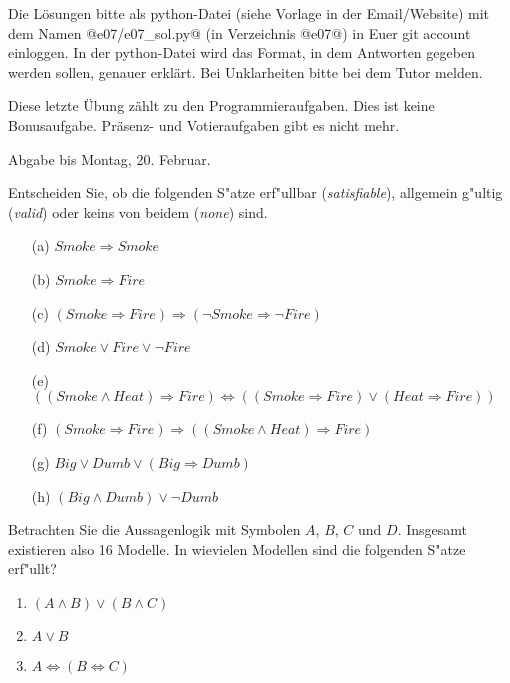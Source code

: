 

\renewcommand{\course}{Artificial Intelligence}
\renewcommand{\coursepicture}{course_ai}
\renewcommand{\coursedate}{Winter 2019}
\renewcommand{\exnum}{7}

\exercises

Die Lösungen bitte als python-Datei (siehe Vorlage in der
Email/Website) mit dem Namen @e07/e07_sol.py@ (in Verzeichnis @e07@)
in Euer git account einloggen. In der python-Datei wird das Format, in
dem Antworten gegeben werden sollen, genauer erklärt. Bei Unklarheiten
bitte bei dem Tutor melden.

Diese letzte Übung zählt zu den Programmieraufgaben. Dies ist keine
Bonusaufgabe. Präsenz- und Votieraufgaben gibt es nicht mehr.

Abgabe bis Montag, 20. Februar.


Entscheiden Sie, ob die folgenden S"atze erf"ullbar (\emph{satisfiable}),
allgemein g"ultig (\emph{valid}) oder keins von beidem (\emph{none})
sind. 

\begin{enumerate}
\item[(a)] $Smoke \Rightarrow Smoke$
\item[(b)] $Smoke \Rightarrow Fire$
\item[(c)] $(Smoke \Rightarrow Fire) \Rightarrow (\neg Smoke \Rightarrow \neg Fire)$
\item[(d)] $Smoke \vee Fire \vee \neg Fire$
\item[(e)] $((Smoke \wedge Heat) \Rightarrow Fire) \Leftrightarrow ((Smoke \Rightarrow Fire) \vee (Heat \Rightarrow Fire))$
\item[(f)] $(Smoke \Rightarrow Fire) \Rightarrow ((Smoke \wedge Heat) \Rightarrow Fire)$
\item[(g)] $Big \vee Dumb \vee (Big \Rightarrow Dumb)$
\item[(h)] $(Big \wedge Dumb) \vee \neg Dumb$
\end{enumerate}



Betrachten Sie die Aussagenlogik mit Symbolen $A$, $B$, $C$ und
$D$. Insgesamt existieren also 16 Modelle. In wievielen Modellen sind die folgenden S"atze erf"ullt?
\begin{enumerate}
\item $(A \wedge B) \vee (B \wedge  C)$
\item $A \vee B$
\item $A \Leftrightarrow (B \Leftrightarrow C)$
\end{enumerate}

